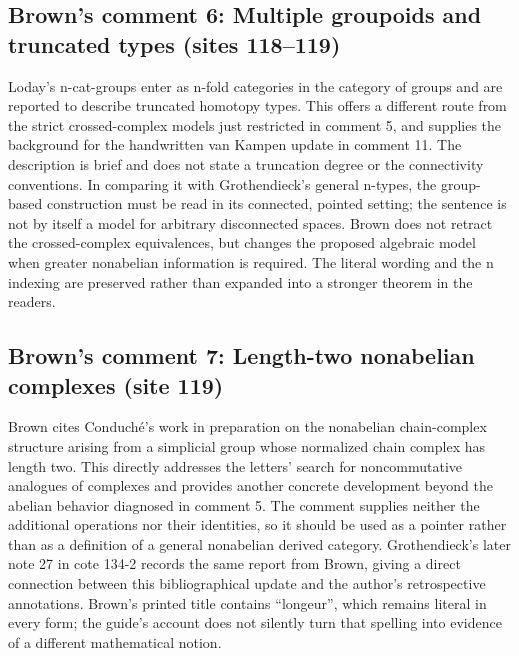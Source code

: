\documentclass[10pt,oneside]{book}
\begin{document}
\subsection*{Brown's comment 6: Multiple groupoids and truncated types (sites 118--119)}
Loday's n-cat-groups enter as n-fold categories in the category of groups and are reported to describe truncated homotopy types. This offers a different route from the strict crossed-complex models just restricted in comment 5, and supplies the background for the handwritten van Kampen update in comment 11. The description is brief and does not state a truncation degree or the connectivity conventions. In comparing it with Grothendieck's general n-types, the group-based construction must be read in its connected, pointed setting; the sentence is not by itself a model for arbitrary disconnected spaces. Brown does not retract the crossed-complex equivalences, but changes the proposed algebraic model when greater nonabelian information is required. The literal wording and the n indexing are preserved rather than expanded into a stronger theorem in the readers.

\subsection*{Brown's comment 7: Length-two nonabelian complexes (site 119)}
Brown cites Conduché's work in preparation on the nonabelian chain-complex structure arising from a simplicial group whose normalized chain complex has length two. This directly addresses the letters' search for noncommutative analogues of complexes and provides another concrete development beyond the abelian behavior diagnosed in comment 5. The comment supplies neither the additional operations nor their identities, so it should be used as a pointer rather than as a definition of a general nonabelian derived category. Grothendieck's later note 27 in cote 134-2 records the same report from Brown, giving a direct connection between this bibliographical update and the author's retrospective annotations. Brown's printed title contains ``longeur'', which remains literal in every form; the guide's account does not silently turn that spelling into evidence of a different mathematical notion.
\end{document}
